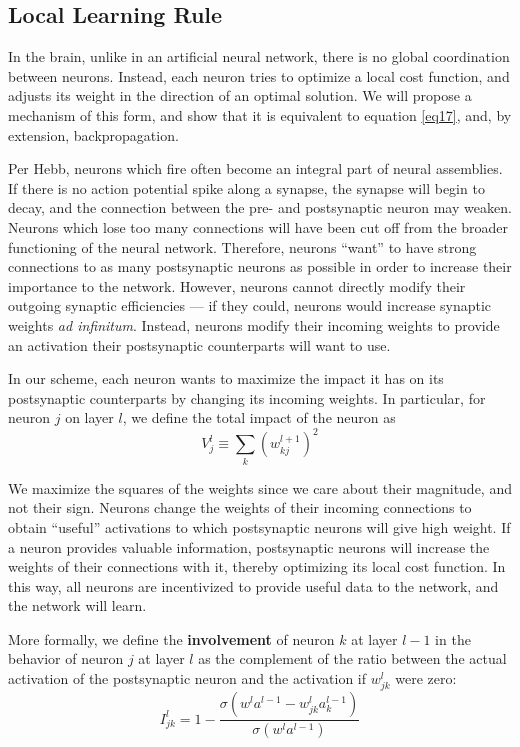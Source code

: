 \documentclass[12pt]{article}
\begin{document}
\subsection{Local Learning Rule}
In the brain, unlike in an artificial neural network, there is no global coordination between neurons. Instead, each neuron tries to optimize a local cost function, and adjusts its weight in the direction of an optimal solution. We will propose a mechanism of this form, and show that it is equivalent to equation \ref{eq17}, and, by extension, backpropagation.

Per Hebb, neurons which fire often become an integral part of neural assemblies. \cite{Hebb1949} If there is no action potential spike along a synapse, the synapse will begin to decay, and the connection between the pre- and postsynaptic neuron may weaken. Neurons which lose too many connections will have been cut off from the broader functioning of the neural network. Therefore, neurons ``want'' to have strong connections to as many postsynaptic neurons as possible in order to increase their importance to the network. However, neurons cannot directly modify their outgoing synaptic efficiencies --- if they could, neurons would increase synaptic weights \emph{ad infinitum}. Instead, neurons modify their incoming weights to provide an activation their postsynaptic counterparts will want to use.

In our scheme, each neuron wants to maximize the impact it has on its postsynaptic counterparts by changing its incoming weights. In particular, for neuron $j$ on layer $l$, we define the total impact of the neuron as
\begin{equation}
	V^l_j \equiv \sum_k \left(w_{kj}^{l+1}\right)^2\label{eq3}
\end{equation}

We maximize the squares of the weights since we care about their magnitude, and not their sign. Neurons change the weights of their incoming connections to obtain ``useful'' activations to which postsynaptic neurons will give high weight. If a neuron provides valuable information, postsynaptic neurons will increase the weights of their connections with it, thereby optimizing its local cost function. In this way, all neurons are incentivized to provide useful data to the network, and the network will learn.

More formally, we define the \textbf{involvement} of neuron $k$ at layer $l-1$ in the behavior of neuron $j$ at layer $l$ as the complement of the ratio between the actual activation of the postsynaptic neuron and the activation if $w_{jk}^l$ were zero:
\begin{equation}
	I_{jk}^{l} = 1-\frac{\sigma\left(w^l a^{l-1} - w_{jk}^l a^{l-1}_k\right)}{\sigma\left(w^l a^{l-1}\right)}\label{eq4}
\end{equation}
\end{document}
